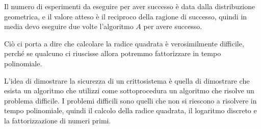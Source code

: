 Il numero di esperimenti da eseguire per aver successo è data dalla distribuzione geometrica,
e il valore atteso è il reciproco della ragione di successo, quindi in media devo eseguire
due volte l'algoritmo $A$ per avere successo.

Ciò ci porta a dire che calcolare la radice quadrata è verosimilmente difficile, perché 
se qualcuno ci riuscisse allora potremmo fattorizzare in tempo polinomiale.

L'idea di dimostrare la sicurezza di un crittosistema è quella di dimostrare che esista un algoritmo 
che utilizzi come sottoprocedura un algoritmo che risolve un problema difficile.
I problemi difficili sono quelli che non si riescono a risolvere in tempo polinomiale, quindi
il calcolo della radice quadrata, il logaritmo discreto e la fattorizzazione di numeri primi.
